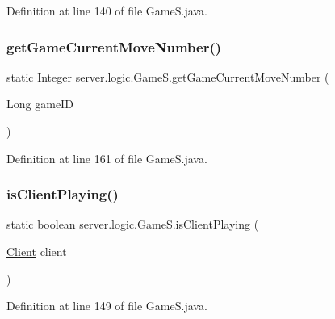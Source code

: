 Definition at line 140 of file Game\+S.\+java.

\hypertarget{classserver_1_1logic_1_1_game_s_a92e4c9561cc42c2d73027c2ea3596a08}{}\label{classserver_1_1logic_1_1_game_s_a92e4c9561cc42c2d73027c2ea3596a08} 
\subsubsection{\texorpdfstring{get\+Game\+Current\+Move\+Number()}{getGameCurrentMoveNumber()}}
{\footnotesize\ttfamily static Integer server.\+logic.\+Game\+S.\+get\+Game\+Current\+Move\+Number (\begin{DoxyParamCaption}\item[{Long}]{game\+ID }\end{DoxyParamCaption})\hspace{0.3cm}{\ttfamily [static]}}



Definition at line 161 of file Game\+S.\+java.

\hypertarget{classserver_1_1logic_1_1_game_s_ad890825fc5720c163f772d810d95e4ff}{}\label{classserver_1_1logic_1_1_game_s_ad890825fc5720c163f772d810d95e4ff} 
\subsubsection{\texorpdfstring{is\+Client\+Playing()}{isClientPlaying()}}
{\footnotesize\ttfamily static boolean server.\+logic.\+Game\+S.\+is\+Client\+Playing (\begin{DoxyParamCaption}\item[{\hyperlink{classserver_1_1conn_1_1_client}{Client}}]{client }\end{DoxyParamCaption})\hspace{0.3cm}{\ttfamily [static]}}



Definition at line 149 of file Game\+S.\+java.

\hypertarget{classserver_1_1logic_1_1_game_s_a4cacb73ebb00070b5c072bea676e92f8}{}\label{classserver_1_1logic_1_1_game_s_a4cacb73ebb00070b5c072bea676e92f8} 
